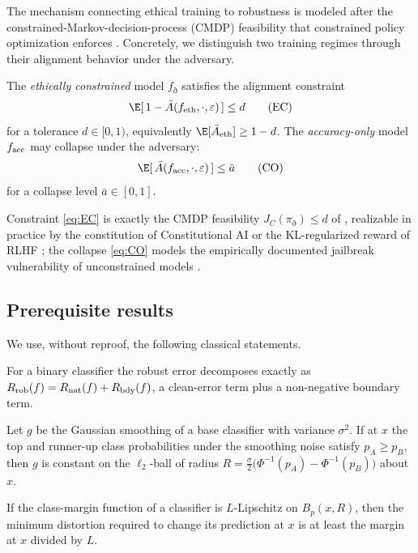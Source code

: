 The mechanism connecting ethical training to robustness is modeled after the
constrained-Markov-decision-process (CMDP) feasibility that constrained policy
optimization enforces \cite{Achiam2017}. Concretely, we distinguish two training
regimes through their alignment behavior under the adversary.

\begin{definition}\label{def:ec}
The \emph{ethically constrained} model $f_\eth$ satisfies the alignment constraint
\begin{equation}\label{eq:EC}
  \E[\,1-\bar A(f_\eth,\cdot,\varepsilon)\,]\le d \tag{EC}
\end{equation}
for a tolerance $d\in[0,1)$, equivalently $\E[\bar A_\eth]\ge 1-d$. The
\emph{accuracy-only} model $f_{\mathrm{acc}}$ may collapse under the adversary:
\begin{equation}\label{eq:CO}
  \E[\,\bar A(f_\acc,\cdot,\varepsilon)\,]\le \bar a \tag{CO}
\end{equation}
for a collapse level $\bar a\in[0,1]$.
\end{definition}

Constraint \eqref{eq:EC} is exactly the CMDP feasibility $J_C(\pi_\eth)\le d$ of
\cite[Def.~2, Prop.~2]{Achiam2017}, realizable in practice by the constitution of
Constitutional AI \cite{Bai2022a} or the KL-regularized reward of RLHF
\cite{Ouyang2022,Bai2022b}; the collapse \eqref{eq:CO} models the empirically
documented jailbreak vulnerability of unconstrained models \cite{Zou2023}.

\subsection{Prerequisite results}
We use, without reproof, the following classical statements.

\begin{theorem}\label{thm:trades}
For a binary classifier the robust error decomposes exactly as
$R_{\mathrm{rob}}(f)=R_{\mathrm{nat}}(f)+R_\mathrm{bdy}(f)$, a clean-error term plus a non-negative
boundary term.
\end{theorem}

\begin{theorem}\label{thm:cohen}
Let $g$ be the Gaussian smoothing of a base classifier with variance $\sigma^2$. If
at $x$ the top and runner-up class probabilities under the smoothing noise satisfy
$p_A\ge p_B$, then $g$ is constant on the $\ell_2$-ball of radius
$R=\tfrac{\sigma}{2}\big(\Phi^{-1}(p_A)-\Phi^{-1}(p_B)\big)$ about $x$.
\end{theorem}

\begin{theorem}\label{thm:clever}
If the class-margin function of a classifier is $L$-Lipschitz on $B_p(x,R)$, then
the minimum distortion required to change its prediction at $x$ is at least the
margin at $x$ divided by $L$.
\end{theorem}
